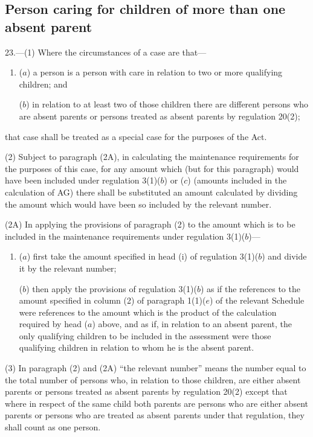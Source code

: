 \documentclass[12pt,a4paper]{article}
\begin{document}
\subsection[23. Person caring for children of more than one absent parent]{Person caring for children of more than one absent parent}

23.—(1) Where the circumstances of a case are that—
\begin{enumerate}\item[]
($a$) a person is a person with care in relation to two or more qualifying children; and

($b$) in relation to at least two of those children there are different persons who are absent parents or persons treated as absent parents by regulation 20(2);
\end{enumerate}
that case shall be treated as a special case for the purposes of the Act.

(2) 
Subject to paragraph (2A), %
in calculating the maintenance requirements for the purposes of this case, for any amount which (but for this paragraph) would have been included under regulation 3(1)($b$)
or ($c$)  %
(amounts included in the calculation of AG) there shall be substituted an amount calculated by dividing the amount which would have been so included by the relevant number.

(2A) In applying the provisions of paragraph (2) to the amount which is to be included in the maintenance requirements under regulation 3(1)($b$)—
\begin{enumerate}\item[]
($a$) first take the amount specified in head (i) of regulation 3(1)($b$) and divide it by the relevant number;

($b$) then apply the provisions of regulation 3(1)($b$) as if the references to the amount specified in column (2) of paragraph 1(1)($e$) of the relevant Schedule were references to the amount which is the product of the calculation required by head ($a$) above, and as if, in relation to an absent parent, the only qualifying children to be included in the assessment were those qualifying children in relation to whom he is the absent parent.
\end{enumerate}

(3) 
In paragraph (2) and (2A) %
“the relevant number” means the number equal to the total number of persons who, in relation to those children, are either absent parents or persons treated as absent parents by regulation 20(2) except that where in respect of the same child both parents are persons who are either absent parents or persons who are treated as absent parents under that regulation, they shall count as one person.
\end{document}
